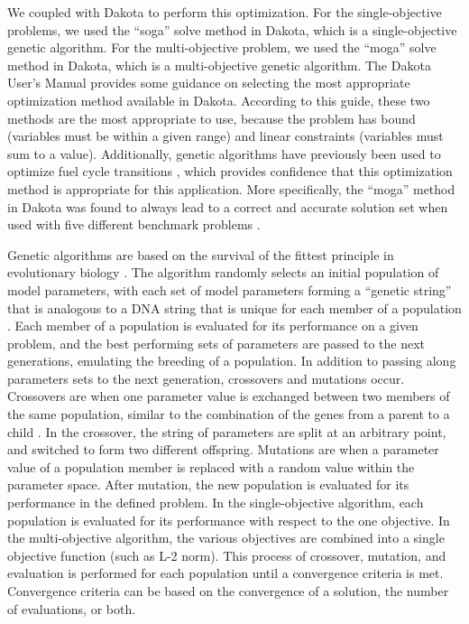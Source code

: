 We coupled \Cyclus \cite{huff_fundamental_2016} with Dakota 
\cite{adams_dakota_2021} to perform this optimization. For the 
single-objective problems, we used the ``soga'' solve method in 
Dakota, which is a single-objective genetic algorithm. For the 
multi-objective problem, we used the ``moga'' solve method in 
Dakota, which is a multi-objective genetic algorithm. The Dakota 
User's Manual \cite{adams_dakota_2021} provides some guidance 
on selecting the most appropriate optimization method available 
in Dakota. According to this guide, these two methods are the most 
appropriate to use, because the problem has bound (variables 
must be within a given range) and linear constraints (variables must 
sum to a value). Additionally, genetic algorithms
have previously been used to optimize fuel cycle transitions 
\cite{passerini_systematic_2014}, which provides confidence that 
this optimization method is appropriate for this application. 
More specifically, the ``moga'' method 
in Dakota was found to always lead to a correct and accurate solution set 
when used with five different benchmark problems \cite{chiandussi_comparison_2012}.

Genetic algorithms are based on the survival of the fittest principle in 
evolutionary biology \cite{adams_dakota_2021}. The algorithm randomly 
selects an initial population of model parameters, with each set of model 
parameters forming a ``genetic string'' that is analogous to a DNA string 
that is unique for each member of a population \cite{adams_dakota_2021}.
Each member of a population is evaluated for its performance on a given 
problem, and the best performing sets of parameters are passed to the next 
generations, emulating the breeding of a population. In addition to 
passing along parameters sets to the next generation, crossovers and 
mutations occur. Crossovers are when one parameter value is exchanged 
between two members of the same population, similar to the combination of 
the genes from a parent to a child \cite{kramer_genetic_2017}. In 
the crossover, the string of parameters are split at an arbitrary point, and 
switched to form two different offspring.
Mutations are when a parameter 
value of a population member is replaced with a random value within the 
parameter space. After mutation, the new population is evaluated for 
its performance in the defined problem. In the single-objective algorithm, 
each population is evaluated for its performance with respect to the one 
objective. In the multi-objective algorithm, the various objectives 
are combined into a single objective function (such as L-2 norm). 
This process of 
crossover, mutation, and evaluation is performed for each population 
until a convergence criteria is met. Convergence criteria can be based on 
the convergence of a solution, the number of evaluations, or both. 


